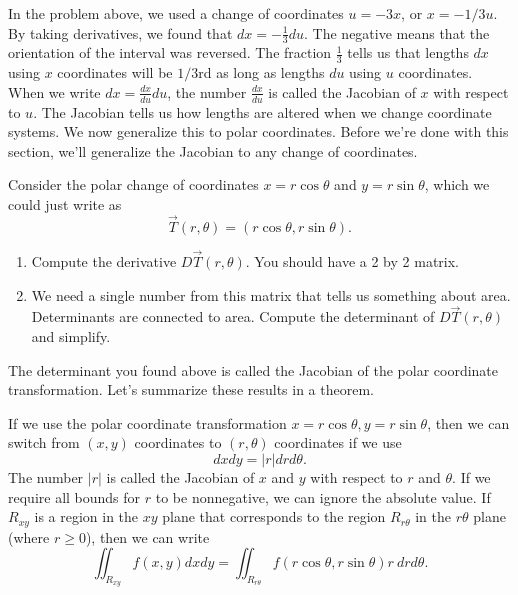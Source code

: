 In the problem above, we used a change of coordinates $u=-3x$, or $x=-1/3 u$.  By taking derivatives, we found that $dx=-\frac{1}{3}du$. The negative means that the orientation of the interval was reversed. The fraction $\frac13$ tells us that lengths $dx$ using $x$ coordinates will be $1/3$rd as long as lengths $du$ using $u$ coordinates. When we write $dx = \frac{dx}{du}du$, the number $\frac{dx}{du}$ is called the Jacobian of $x$ with respect to $u$. The Jacobian tells us how lengths are altered when we change coordinate systems. We now generalize this to polar coordinates. Before we're done with this section, we'll generalize the Jacobian to any change of coordinates.

\begin{problem}
 Consider the polar change of coordinates $x=r\cos\theta$ and $y=r\sin\theta$, which we could just write as $$\vec T(r,\theta)=(r\cos\theta,r\sin\theta).$$
\begin{enumerate}
 \item Compute the derivative $D\vec T(r,\theta)$.  You should have a 2 by 2 matrix.
 \item We need a single number from this matrix that tells us something about area.  Determinants are connected to area.  Compute the determinant of $D\vec T(r,\theta)$ and simplify.  
\end{enumerate}
\end{problem}

The determinant you found above is called the Jacobian of the polar coordinate transformation.  Let's summarize these results in a theorem. 



\begin{theorem}%
 If we use the polar coordinate transformation $x=r\cos\theta, y=r\sin\theta$, then we can switch from $(x,y)$ coordinates to $(r,\theta)$ coordinates if we use $$dxdy=|r|drd\theta.$$  The number $|r|$ is called the Jacobian of $x$ and $y$ with respect to $r$ and $\theta$. If we require all bounds for $r$ to be nonnegative, we can ignore the absolute value.  If $R_{xy}$ is a region in the $xy$ plane that corresponds to the region $R_{r\theta}$ in the $r\theta$ plane (where $r\geq 0$), then we can write $$\iint_{R_{xy}} f(x,y) dxdy = \iint_{R_{r\theta}} f(r\cos\theta,r\sin\theta) r\ drd\theta.$$ 
\end{theorem}


